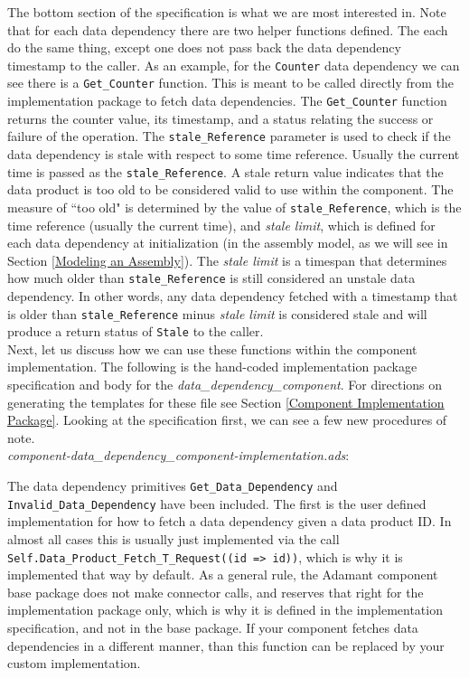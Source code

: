 The bottom section of the specification is what we are most interested in. Note that for each data dependency there are two helper functions defined. The each do the same thing, except one does not pass back the data dependency timestamp to the caller. As an example, for the \texttt{Counter} data dependency we can see there is a \texttt{Get\_Counter} function. This is meant to be called directly from the implementation package to fetch data dependencies. The \texttt{Get\_Counter} function returns the counter value, its timestamp, and a status relating the success or failure of the operation. The \texttt{stale\_Reference} parameter is used to check if the data dependency is stale with respect to some time reference. Usually the current time is passed as the \texttt{stale\_Reference}. A stale return value indicates that the data product is too old to be considered valid to use within the component. The measure of ``too old" is determined by the value of \texttt{stale\_Reference}, which is the time reference (usually the current time), and \textit{stale limit}, which is defined for each data dependency at initialization (in the assembly model, as we will see in Section \ref{Modeling an Assembly}). The \textit{stale limit} is a timespan that determines how much older than \texttt{stale\_Reference} is still considered an unstale data dependency. In other words, any data dependency fetched with a timestamp that is older than \texttt{stale\_Reference} minus \textit{stale limit} is considered stale and will produce a return status of \texttt{Stale} to the caller. \\

Next, let us discuss how we can use these functions within the component implementation. The following is the hand-coded implementation package specification and body for the \textit{data\_dependency\_component}. For directions on generating the templates for these file see Section \ref{Component Implementation Package}. Looking at the specification first, we can see a few new procedures of note. \\

\textit{component-data\_dependency\_component-implementation.ads}:

The data dependency primitives \texttt{Get\_Data\_Dependency} and \texttt{Invalid\_Data\_Dependency} have been included. The first is the user defined implementation for how to fetch a data dependency given a data product ID. In almost all cases this is usually just implemented via the call \texttt{Self.Data\_Product\_Fetch\_T\_Request((id => id))}, which is why it is implemented that way by default. As a general rule, the Adamant component base package does not make connector calls, and reserves that right for the implementation package only, which is why it is defined in the implementation specification, and not in the base package. If your component fetches data dependencies in a different manner, than this function can be replaced by your custom implementation. \\

